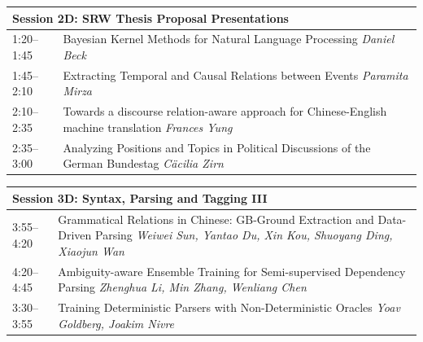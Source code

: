 \documentclass{book}
\renewcommand{\large}{\fontsize{36}{40}\selectfont}
\begin{document}
\begin{tabular}{p{3in}p{16in}}
  \multicolumn{2}{l}{\bfseries\large Session 2D: SRW Thesis Proposal Presentations} \\\hline

    
    1:20--1:45
    &	Bayesian Kernel Methods for Natural Language Processing \newline 
    {\itshape Daniel Beck} \\
    
    1:45--2:10
    &	Extracting Temporal and Causal Relations between Events \newline 
    {\itshape Paramita Mirza} \\
    
    2:10--2:35
    &	Towards a discourse relation-aware approach for Chinese-English machine translation \newline 
    {\itshape Frances Yung} \\
    
    2:35--3:00
    &	Analyzing Positions and Topics in Political Discussions of the German Bundestag \newline 
    {\itshape Cäcilia Zirn} \\
    
\end{tabular}

\begin{tabular}{p{3in}p{16in}}
  \multicolumn{2}{l}{\bfseries\large Session 3D: Syntax, Parsing and Tagging III} \\\hline

    
    3:55--4:20
    &	Grammatical Relations in Chinese: GB-Ground Extraction and Data-Driven Parsing \newline 
    {\itshape Weiwei Sun, Yantao Du, Xin Kou, Shuoyang Ding, Xiaojun Wan} \\
    
    4:20--4:45
    &	Ambiguity-aware Ensemble Training for Semi-supervised Dependency Parsing \newline 
    {\itshape Zhenghua Li, Min Zhang, Wenliang Chen} \\
    
    3:30--3:55
    &	Training Deterministic Parsers with Non-Deterministic Oracles \newline 
    {\itshape Yoav Goldberg, Joakim Nivre} \\
    
\end{tabular}
\end{document}
